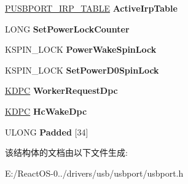 \begin{DoxyCompactItemize}
\item 
\mbox{\label{struct___u_s_b_p_o_r_t___d_e_v_i_c_e___e_x_t_e_n_s_i_o_n_ae2aa5aefebc06915fb028877676c8ed3}} 
\hyperlink{struct___u_s_b_p_o_r_t___i_r_p___t_a_b_l_e}{P\+U\+S\+B\+P\+O\+R\+T\+\_\+\+I\+R\+P\+\_\+\+T\+A\+B\+LE} {\bfseries Active\+Irp\+Table}
\item 
\mbox{\label{struct___u_s_b_p_o_r_t___d_e_v_i_c_e___e_x_t_e_n_s_i_o_n_aed7f8f20125c7c01ed0510df538be1f3}} 
L\+O\+NG {\bfseries Set\+Power\+Lock\+Counter}
\item 
\mbox{\label{struct___u_s_b_p_o_r_t___d_e_v_i_c_e___e_x_t_e_n_s_i_o_n_a1e1780e23bd6ae9d3c0ca3acedd5f99c}} 
K\+S\+P\+I\+N\+\_\+\+L\+O\+CK {\bfseries Power\+Wake\+Spin\+Lock}
\item 
\mbox{\label{struct___u_s_b_p_o_r_t___d_e_v_i_c_e___e_x_t_e_n_s_i_o_n_a3aa90584b3d5407b3204781e784b3693}} 
K\+S\+P\+I\+N\+\_\+\+L\+O\+CK {\bfseries Set\+Power\+D0\+Spin\+Lock}
\item 
\mbox{\label{struct___u_s_b_p_o_r_t___d_e_v_i_c_e___e_x_t_e_n_s_i_o_n_ac581a57081d1eb14172dd0aa78b19ebd}} 
\hyperlink{struct___k_d_p_c}{K\+D\+PC} {\bfseries Worker\+Request\+Dpc}
\item 
\mbox{\label{struct___u_s_b_p_o_r_t___d_e_v_i_c_e___e_x_t_e_n_s_i_o_n_a34b20934a8db05579b6d6a3e8e07e54e}} 
\hyperlink{struct___k_d_p_c}{K\+D\+PC} {\bfseries Hc\+Wake\+Dpc}
\item 
\mbox{\label{struct___u_s_b_p_o_r_t___d_e_v_i_c_e___e_x_t_e_n_s_i_o_n_add4804849502b6c17d1ae70fa04306ff}} 
U\+L\+O\+NG {\bfseries Padded} \mbox{[}34\mbox{]}
\end{DoxyCompactItemize}


该结构体的文档由以下文件生成\+:\begin{DoxyCompactItemize}
\item 
E\+:/\+React\+O\+S-\/0../drivers/usb/usbport/usbport.\+h\end{DoxyCompactItemize}
